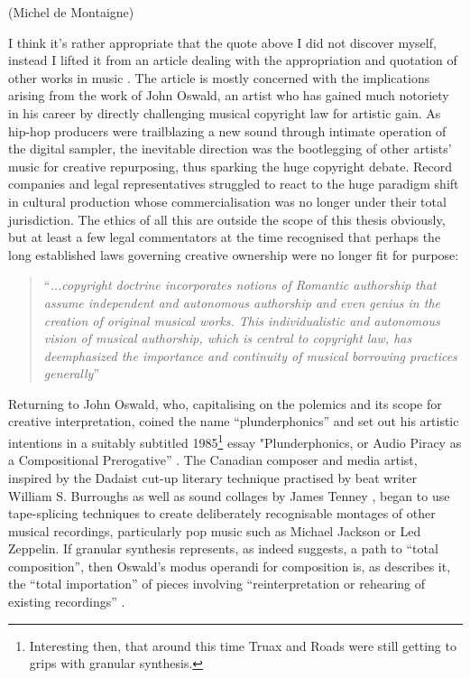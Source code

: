 \begin{flushright}
(Michel de Montaigne)
\end{flushright}

I think it's rather appropriate that the quote above I did not discover myself, instead I lifted it from an article dealing with the appropriation and quotation of other works in music \citep{Holm-Hudson1997}. The article is mostly concerned with the implications arising from the work of John Oswald, an artist who has gained much notoriety in his career by directly challenging musical copyright law for artistic gain. As hip-hop producers were trailblazing a new sound through intimate operation of the digital sampler, the inevitable direction was the bootlegging of other artists' music for creative repurposing, thus sparking the huge copyright debate. Record companies and legal representatives struggled to react to the huge paradigm shift in cultural production whose commercialisation was no longer under their total jurisdiction. The ethics of all this are outside the scope of this thesis obviously, but at least a few legal commentators at the time recognised that perhaps the long established laws governing creative ownership were no longer fit for purpose:

\blockcquote[]{Arewa1979}{``\textit{...copyright doctrine incorporates notions of Romantic authorship that assume independent and autonomous authorship and even genius in the creation of original musical works. This individualistic and autonomous vision of musical authorship, which is central to copyright law, has deemphasized the importance and continuity of musical borrowing practices generally}''}

Returning to John Oswald, who, capitalising on the polemics and its scope for creative interpretation, coined the name ``plunderphonics'' and set out his artistic intentions in a suitably subtitled 1985\footnote{Interesting then, that around this time Truax and Roads were still getting to grips with granular synthesis.} essay "Plunderphonics, or Audio Piracy as a Compositional Prerogative” \citep{Oswald1985}. The Canadian composer and media artist, inspired by the Dadaist cut-up literary technique practised by beat writer William S. Burroughs as well as sound collages by James Tenney \citep{Cox2004}, began to use tape-splicing techniques to create deliberately recognisable montages of other musical recordings, particularly pop music such as Michael Jackson or Led Zeppelin. If granular synthesis represents, as \cite{Thomson2004} indeed suggests,  a path to ``total composition'', then Oswald's modus operandi for composition is, as \cite{Holm-Hudson1997} describes it, the ``total importation'' of pieces involving ``reinterpretation or rehearing of existing recordings'' \citep{Cutler1994}.


